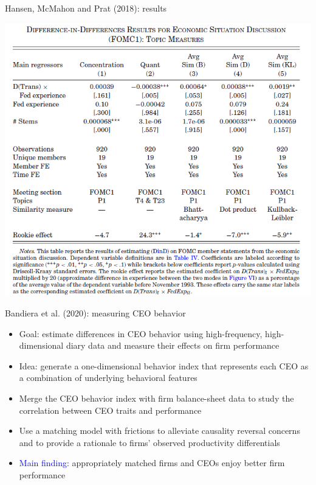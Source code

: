 \documentclass[english]{beamer}
\begin{document}
\begin{frame}{\small{Hansen, McMahon and Prat (2018): results}}
\vspace{-7pt}
\begin{center}
\includegraphics[scale=0.4]{Images/hansen2018f.png}
\end{center}
\end{frame}


\begin{frame}{Bandiera et al. (2020): measuring CEO behavior}
\begin{itemize}
\setlength{\itemsep}{1.2em}
\item Goal: estimate differences in CEO behavior using high-frequency, high-dimensional diary data and measure their effects on firm performance
\item Idea: generate a one-dimensional behavior index that represents each CEO as a combination of underlying behavioral features 
\item Merge the CEO behavior index with firm balance-sheet data to study the correlation between CEO traits and performance
\item Use a matching model with frictions to alleviate causality reversal concerns and to provide a rationale to firms' observed productivity differentials 
\item \textcolor{blue}{Main finding:} appropriately matched firms and CEOs enjoy better firm performance

\end{itemize}
\end{frame}%
\end{document}
